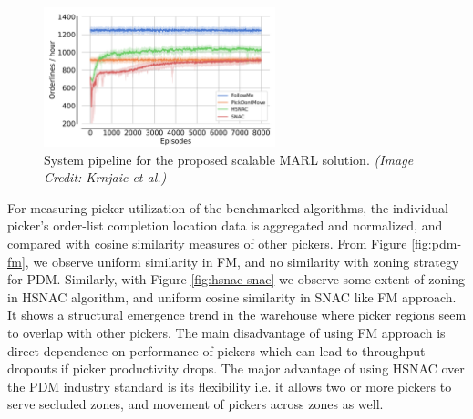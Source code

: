 \documentclass{article}
\begin{document}
\begin{figure}[h]
    \centering
    \includegraphics[width=0.6\textwidth]{rl-result-curve.png}
    \caption{System pipeline for the proposed scalable MARL solution. \textit{(Image Credit: Krnjaic et al.)}}
    \label{fig:scale-learn-curve}
\end{figure}


For measuring picker utilization of the benchmarked algorithms, the individual picker’s order-list completion location data is aggregated and normalized, and compared with cosine similarity measures of other pickers.
From Figure \ref{fig:pdm-fm}, we observe uniform similarity in FM, and no similarity with zoning strategy for PDM.
Similarly, with Figure \ref{fig:hsnac-snac} we observe some extent of zoning in HSNAC algorithm, and uniform cosine similarity in SNAC like FM approach.
It shows a structural emergence trend in the warehouse where picker regions seem to overlap with other pickers.
The main disadvantage of using FM approach is direct dependence on performance of pickers which can lead to throughput dropouts if picker productivity drops.
The major advantage of using HSNAC over the PDM industry standard is its flexibility i.e. it allows two or more pickers to serve secluded zones, and movement of pickers across zones as well.
\end{document}
